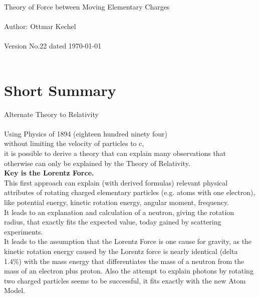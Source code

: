 \documentclass[10pt,titlepage]{article}
\begin{document}
\author{Ottmar Kechel}
\date{\today}


\large  {\LARGE{Theory of Force between Moving Elementary Charges}}
\\\\
Author: Ottmar Kechel        
\\\\
Version No.22 dated \today  \\\\
\tableofcontents
\newpage
\section{Short Summary}
Alternate Theory to Relativity
\\\\
Using Physics of 1894 (eighteen hundred ninety four)\\
without limiting the velocity of particles to c,\\
it is possible to derive a theory that can explain many observations that otherwise can only be explained by the Theory of Relativity.\\
\textbf{Key is the Lorentz Force.} \\
This first approach can explain (with derived formulas) relevant physical attributes of rotating charged elementary particles (e.g. atoms with one electron), like potential energy, kinetic rotation energy, angular moment, frequency.\\
It leads to an explanation and calculation of a neutron, giving the rotation radius, that exactly fits the expected value, today gained by scattering experiments.\\
It leads to the assumption that the Lorentz Force is one cause for gravity, as the kinetic rotation energy caused by the Lorentz force is nearly identical (delta 1.4\%) with the mass energy that differentiates the mass of a neutron from the mass of an electron plus proton.
Also the attempt to explain photons by rotating two charged particles seems to be successful, it fits exactly with the new Atom Model.




\end{document}
